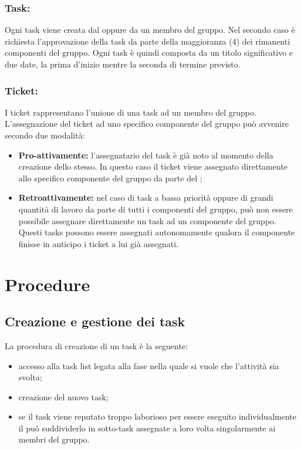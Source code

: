 \documentclass[NormeDiProgetto.tex]{subfiles}
\begin{document}
	\subsubsection{Task:}
	Ogni task viene creata dal \respdiprog{} oppure da un membro del gruppo. Nel secondo caso è richiesta l'approvazione della task da parte della maggioranza (4) dei rimanenti componenti del gruppo.
	Ogni task è quindi composta da un titolo significativo e due date, la prima d'inizio mentre la seconda di termine previsto.
	
	\subsubsection{Ticket:}
	I ticket rappresentano l'unione di una task ad un membro del gruppo.
	L'assegnazione del ticket ad uno specifico componente del gruppo può avvenire secondo due modalità:
	\begin{itemize}
		\item \textbf{Pro-attivamente:} l'assegnatario del task è già noto al momento della creazione dello stesso. In questo caso il ticket viene assegnato direttamente allo specifico componente del gruppo da parte del \respdiprog; 
		\item \textbf{Retroattivamente:} nel caso di task a bassa priorità oppure di grandi quantità di lavoro da parte di tutti i componenti del gruppo, può non essere possibile assegnare direttamente un task ad un componente del gruppo. Questi tasks possono essere assegnati autonomamente qualora il componente finisse in anticipo i ticket a lui già assegnati.
	\end{itemize}
	
	\section{Procedure}
	\subsection{Creazione e gestione dei task}	
	La procedura di creazione di un task è la seguente:
	\begin{itemize}
		\item accesso alla task list legata alla fase nella quale si vuole che l'attività sia svolta;
		\item creazione del nuovo task;
		\item se il task viene reputato troppo laborioso per essere eseguito individualmente il \respdiprog{} può suddividerlo in sotto-task assegnate a loro volta singolarmente ai membri del gruppo.	
	\end{itemize}		
	
\end{document}
